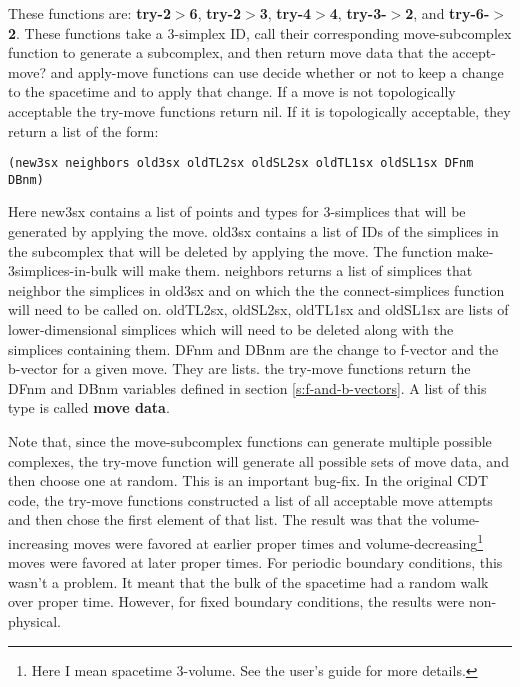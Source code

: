 \message{ !name(programmers_guide.tex)}\documentclass[12pt]{article}
\begin{document}
These functions are: \textbf{try-2$>$6}, \textbf{try-2$>$3},
\textbf{try-4$>$4}, \textbf{try-3-$>$2}, and
\textbf{try-6-$>$2}. These functions take a 3-simplex ID, call their
corresponding move-subcomplex function to generate a subcomplex, and
then return move data that the accept-move? and apply-move functions
can use decide whether or not to keep a change to the spacetime and to
apply that change. If a move is not topologically acceptable the
try-move functions return nil. If it is topologically acceptable, they
return a list of the form:
\begin{small}
\begin{lstlisting}
(new3sx neighbors old3sx oldTL2sx oldSL2sx oldTL1sx oldSL1sx DFnm DBnm)
\end{lstlisting}
\end{small}
Here new3sx contains a list of points and types for 3-simplices that
will be generated by applying the move. old3sx contains a list of IDs
of the simplices in the subcomplex that will be deleted by applying
the move. The function make-3simplices-in-bulk will make
them. neighbors returns a list of simplices that neighbor the
simplices in old3sx and on which the the connect-simplices function
will need to be called on. oldTL2sx, oldSL2sx, oldTL1sx and oldSL1sx
are lists of lower-dimensional simplices which will need to be deleted
along with the simplices containing them. DFnm and DBnm are the change
to f-vector and the b-vector for a given move. They are lists. the
try-move functions return the DFnm and DBnm variables defined in
section \ref{s:f-and-b-vectors}. A list of this type is called
\textbf{move data}.

Note that, since the move-subcomplex functions can generate multiple
possible complexes, the try-move function will generate all possible
sets of move data, and then choose one at random. This is an important
bug-fix. In the original CDT code, the try-move functions constructed
a list of all acceptable move attempts and then chose the first
element of that list. The result was that the volume-increasing moves
were favored at earlier proper times and
volume-decreasing\footnote{Here I mean spacetime 3-volume. See the
  user's guide for more details.} moves were favored at later proper
times. For periodic boundary conditions, this wasn't a problem. It
meant that the bulk of the spacetime had a random walk over proper
time. However, for fixed boundary conditions, the results were
non-physical.
\end{document}
